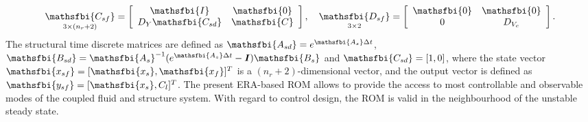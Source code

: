 \documentclass[standard]{jfm}
\begin{document}
\[
\underset{3 \times (n_r+2)}{\mathsfbi{C_{sf}}}=\left[ \begin{array}{cc}
\mathsfbi{I} & \mathsfbi{0} \\
D_Y\mathsfbi{C_{sd}} & \mathsfbi{C}
\end{array}  \right], \quad
\underset{3 \times 2}{\mathsfbi{D_{sf}}}=\left[ \begin{array}{cc}
\mathsfbi{0} & \mathsfbi{0} \\
0 & D_{V_c}
\end{array}  \right].
\]
%
The structural time discrete matrices are defined as 
$\mathsfbi{A_{sd}}=e^{\mathsfbi{A_{s}}\Delta t}$, 
$\mathsfbi{B_{sd}}={\mathsfbi{A_{s}}}^{-1}(e^{\mathsfbi{A_{s}}\Delta t}-\boldsymbol{I})\mathsfbi{B_{s}}$ 
and $\mathsfbi{C_{sd}}=[1,0]$, 
%
where the state vector $\mathsfbi{x_{sf}}=[\mathsfbi{x_{s}},\mathsfbi{x_{f}}]^T$ is a $(n_r+2)$-dimensional vector, and the output
vector is defined as $\mathsfbi{y_{sf}}=[\mathsfbi{x_{s}},C_l]^T$. 
The present ERA-based ROM allows to provide the access to most controllable 
and observable modes of the coupled fluid
and structure system. With regard to control design, the ROM 
is valid in the neighbourhood of the unstable steady state.
\end{document}
